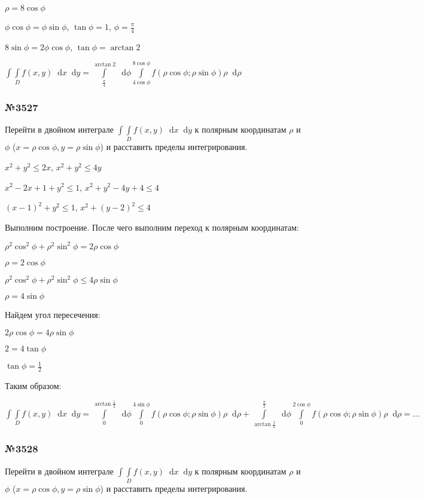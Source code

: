 \documentclass{article}
\newcommand*\diff{\mathop{}\!\mathrm{d}}
\begin{document}
$\rho = 8 \cos \phi$

$\phi \cos \phi = \phi \sin \phi$, $\tan \phi = 1$, $\phi = \frac{\pi}{4}$

$8 \sin \phi = 2 \phi \cos \phi$, $\tan \phi = \arctan 2$

$\int\int\limits_{D} f(x, y) \diff x \diff y = \int\limits_{\frac{\pi}{4}}^{\arctan 2} \diff \phi \int\limits_{4 \cos \phi}^{8 \cos \phi} f(\rho \cos \phi; \rho \sin \phi) \rho \diff \rho$

\subsubsection{№3527}

Перейти в двойном интеграле $\int\int\limits_{D} f(x, y) \diff x \diff y$ к полярным координатам $\rho$ и $\phi$ ($x = \rho \cos \phi, y = \rho \sin \phi$) и расставить пределы интегрирования.

$x^2 + y^2 \le 2x$, $x^2 + y^2 \le 4y$

$x^2 - 2x + 1 + y^2 \le 1$, $x^2 + y^2 - 4y + 4 \le 4$

$(x-1)^2 + y^2 \le 1$, $x^2 + (y-2)^2 \le 4$

Выполним построение. После чего выполним переход к полярным координатам:

$\rho^2 \cos^2 \phi + \rho^2 \sin^2 \phi = 2 \rho \cos \phi$

$\rho = 2 \cos \phi$

$\rho^2 \cos^2 \phi + \rho^2 \sin^2 \phi \le 4 \rho \sin \phi$

$\rho = 4 \sin \phi$

Найдем угол пересечения:

$2 \rho \cos \phi = 4 \rho \sin \phi$

$2 = 4 \tan \phi$

$\tan \phi = \frac{1}{2}$

Таким образом:

$\int\int\limits_{D} f(x, y) \diff x \diff y = \int\limits_{0}^{\arctan \frac{1}{2}} \diff \phi \int\limits_{0}^{4 \sin \phi} f(\rho \cos \phi; \rho \sin \phi) \rho \diff \rho + \int\limits_{\arctan \frac{1}{2}}^{\frac{\pi}{2}} \diff \phi \int\limits_{0}^{2 \cos \phi} f(\rho \cos \phi; \rho \sin \phi) \rho \diff \rho = \dots$

\subsubsection{№3528}

Перейти в двойном интеграле $\int\int\limits_{D} f(x, y) \diff x \diff y$ к полярным координатам $\rho$ и $\phi$ ($x = \rho \cos \phi, y = \rho \sin \phi$) и расставить пределы интегрирования.
\end{document}

